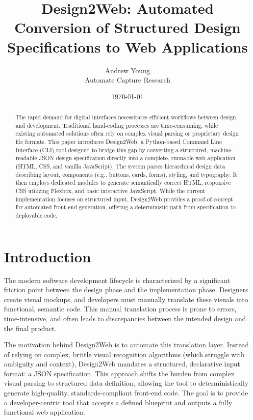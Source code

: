 \documentclass[11pt,a4paper]{article}
\title{Design2Web: Automated Conversion of Structured Design Specifications to Web Applications}
\author{Andrew Young \\ Automate Capture Research}
\date{\today}
\begin{document}
\maketitle

\begin{abstract}
The rapid demand for digital interfaces necessitates efficient workflows between design and development. Traditional hand-coding processes are time-consuming, while existing automated solutions often rely on complex visual parsing or proprietary design file formats. This paper introduces Design2Web, a Python-based Command Line Interface (CLI) tool designed to bridge this gap by converting a structured, machine-readable JSON design specification directly into a complete, runnable web application (HTML, CSS, and vanilla JavaScript). The system parses hierarchical design data describing layout, components (e.g., buttons, cards, forms), styling, and typography. It then employs dedicated modules to generate semantically correct HTML, responsive CSS utilizing Flexbox, and basic interactive JavaScript. While the current implementation focuses on structured input, Design2Web provides a proof-of-concept for automated front-end generation, offering a deterministic path from specification to deployable code.
\end{abstract}

\section{Introduction}
The modern software development lifecycle is characterized by a significant friction point between the design phase and the implementation phase. Designers create visual mockups, and developers must manually translate these visuals into functional, semantic code. This manual translation process is prone to errors, time-intensive, and often leads to discrepancies between the intended design and the final product.

The motivation behind Design2Web is to automate this translation layer. Instead of relying on complex, brittle visual recognition algorithms (which struggle with ambiguity and context), Design2Web mandates a structured, declarative input format: a JSON specification. This approach shifts the burden from complex visual parsing to structured data definition, allowing the tool to deterministically generate high-quality, standards-compliant front-end code. The goal is to provide a developer-centric tool that accepts a defined blueprint and outputs a fully functional web application.
\end{document}
